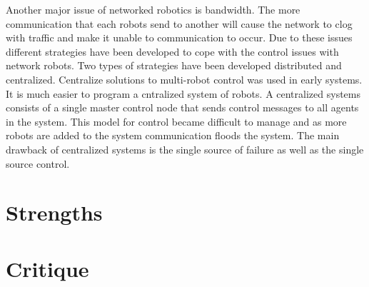 \documentclass{article}
\begin{document}
Another major issue of networked robotics is bandwidth. The more communication that each robots send to another will cause the network to clog with traffic and make it unable to communication to occur. Due to these issues different strategies have been developed to cope with the control issues with network robots. Two types of strategies have been developed distributed and centralized. Centralize solutions to multi-robot control was used in early systems. It is much easier to program a cntralized system of robots. A centralized systems consists of a single master control node that sends control messages to all agents in the system. This model for control  became difficult to manage and as more robots are added to the system communication floods the system. The main drawback of centralized systems is the single source of failure as well as the single source control.
\section*{Strengths}

\section*{Critique}

\cite{ref}
\end{document}
